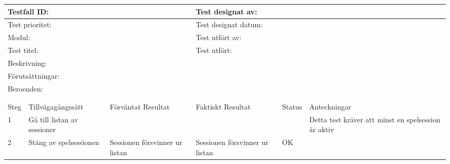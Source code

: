 



\begin{tabular}{| p{1cm}|  p{3cm} | p{3cm}| p{3cm}| p{2cm}| p{3cm}|}
	\hline
	  \multicolumn{3}{|l|}{Testfall ID:}&\multicolumn{3}{|l|}{Test designat av:}\\
	  \hline
	  \multicolumn{3}{|l|}{Test prioritet:}&\multicolumn{3}{|l|}{Test designat datum:}\\
	  \hline
	  \multicolumn{3}{|l|}{Modul:}&\multicolumn{3}{|l|}{Test utfört av:}\\
	  \hline
	  \multicolumn{3}{|l|}{Test titel:}&\multicolumn{3}{|l|}{Test utfört:}\\
	  \hline
	  \multicolumn{6}{|p{\textwidth}|}{Beskrivning:}\\
	  \hline
	  \multicolumn{6}{|p{\textwidth}|}{Förutsättningar:}\\
	  \hline
	  \multicolumn{6}{|p{\textwidth}|}{Beroenden:}\\
  
	\hline
	\multicolumn{6}{|l|}{}\\
	\multicolumn{6}{|l|}{}\\
      	\hline
	Steg&Tillvägagångssätt&Förväntat Resultat&Faktiskt Resultat&Status&Anteckningar \\
	\hline
	1&Gå till listan av sessioner&&&&Detta test kräver att minst en spelsession är aktiv\\
      	\hline
	2&Stäng av spelsessionen&Sessionen försvinner ur listan&Sessionen försvinner ur listan&OK&\\
      	\hline
\end{tabular}



